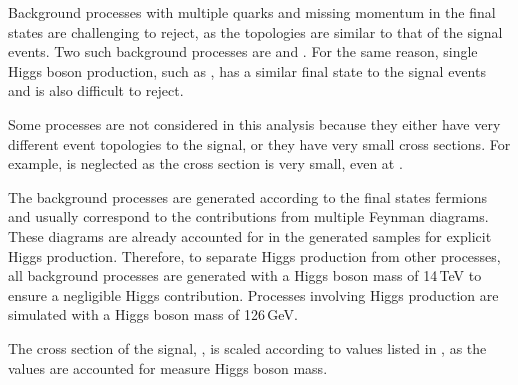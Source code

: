 
Background processes with multiple quarks and missing momentum in the final states are challenging to reject, as the topologies are similar to that of the signal events. Two such background processes are \eeTo{ \Pquark \Pquark \Pquark \Pquark \Pnu \APnu} and \HepProcess{\Pepm\Pphoton \to \Pnu \Pquark \Pquark \Pquark \Pquark}. For the same reason, single Higgs boson production, such as \eeTo{\Pquark \Pquark \PHiggs \Pnu \APnu}, has a similar final state to the signal events and is also difficult to reject.

Some processes are not considered in this analysis because they either have very different event topologies to the signal, or they have very small cross sections. For example,  \HepProcess{\Egamma   \to \Pquark \Pquark \PHiggs \Plepton} is neglected  as the cross section is very small, even at .

The background processes are generated according to the final states fermions and usually correspond to the contributions from multiple Feynman diagrams. These diagrams are already accounted for in the generated samples for explicit Higgs production.   Therefore, to separate Higgs production from other processes, all background processes are generated with a Higgs boson mass of 14\,TeV to ensure a negligible Higgs contribution. Processes involving Higgs production are simulated with a Higgs boson mass of 126\,GeV.


The cross section of the signal, \eeToHHbbWW, is scaled according to values listed in \cite{Dittmaier:2012vm}, as the values are accounted for measure Higgs boson mass.



